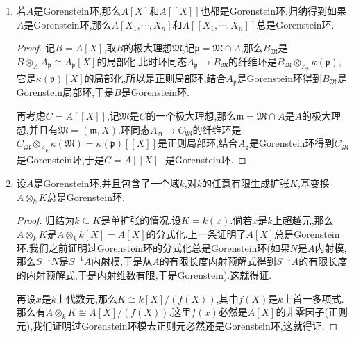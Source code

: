 \begin{enumerate}
\begin{proof}
		于是$B$是Gorenstein环等价于$(0:\mathfrak{n})$是$\kappa(\mathfrak{n}')=\kappa(\mathfrak{n})$上的一维线性空间,这等价于$t=1$并且$(0:\mathfrak{n}')_F$是$\kappa(\mathfrak{n}')=\kappa(\mathfrak{n})$上的一维线性空间,也即$A$和$F$都是Gorenstein环.
	\end{proof}
    \item 若$A$是Gorenstein环,那么$A[X]$和$A[[X]]$也都是Gorenstein环.归纳得到如果$A$是Gorenstein环,那么$A[X_1,\cdots,X_n]$和$A[[X_1,\cdots,X_n]]$总是Gorenstein环.
    \begin{proof}
    	
    	记$B=A[X]$,取$B$的极大理想$\mathfrak{M}$,记$\mathfrak{p}=\mathfrak{M}\cap A$,那么$B_{\mathfrak{M}}$是$B\otimes_AA_{\mathfrak{p}}\cong A_{\mathfrak{p}}[X]$的局部化,此时环同态$A_{\mathfrak{p}}\to B_{\mathfrak{M}}$的纤维环是$B_{\mathfrak{M}}\otimes_{A_{\mathfrak{p}}}\kappa(\mathfrak{p})$,它是$\kappa(\mathfrak{p})[X]$的局部化,所以是正则局部环,结合$A_{\mathfrak{p}}$是Gorenstein环得到$B_{\mathfrak{M}}$是Gorenstein局部环,于是$B$是Gorenstein环.
    	
    	\qquad
    	
    	再考虑$C=A[[X]]$,记$\mathfrak{M}$是$C$的一个极大理想,那么$\mathfrak{m}=\mathfrak{M}\cap A$是$A$的极大理想,并且有$\mathfrak{M}=(\mathfrak{m},X)$.环同态$A_{\mathfrak{m}}\to C_{\mathfrak{M}}$的纤维环是$C_{\mathfrak{M}}\otimes_{A_{\mathfrak{p}}}\kappa(\mathfrak{M})=\kappa(\mathfrak{p})[[X]]$是正则局部环,结合$A_{\mathfrak{p}}$是Gorenstein环得到$C_{\mathfrak{M}}$是Gorenstein环,于是$C=A[[X]]$是Gorenstein环.
    \end{proof}
    \item 设$A$是Gorenstein环,并且包含了一个域$k$,对$k$的任意有限生成扩张$K$,基变换$A\otimes_kK$总是Gorenstein环.
    \begin{proof}
    	
    	归结为$k\subseteq K$是单扩张的情况.设$K=k(x)$.倘若$x$是$k$上超越元,那么$A\otimes_kK$是$A\otimes_kk[X]=A[X]$的分式化.上一条证明了$A[X]$总是Gorenstein环.我们之前证明过Gorenstein环的分式化总是Gorenstein环(如果$N$是$A$内射模,那么$S^{-1}N$是$S^{-1}A$内射模,于是从$A$的有限长度内射预解式得到$S^{-1}A$的有限长度的内射预解式,于是内射维数有限,于是Gorenstein).这就得证.
    	
    	再设$x$是$k$上代数元,那么$K\cong k[X]/(f(X))$,其中$f(X)$是$k$上首一多项式.那么有$A\otimes_kK\cong A[X]/(f(X))$.这里$f(x)$必然是$A[X]$的非零因子(正则元),我们证明过Gorenstein环模去正则元必然还是Gorenstein环,这就得证.
    \end{proof}
\end{enumerate}

